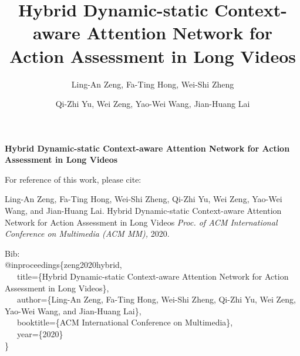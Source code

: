 \documentclass[sigconf]{acmart}
\begin{document}
{\onecolumn
\noindent \vspace{1cm}

\noindent \textbf{\huge{Hybrid Dynamic-static Context-aware Attention Network for Action Assessment in Long Videos}}

\vspace{2cm}


\vspace{2cm}





\noindent For reference of this work, please cite:

\vspace{1cm}
\noindent Ling-An Zeng, Fa-Ting Hong, Wei-Shi Zheng, Qi-Zhi Yu, Wei Zeng, Yao-Wei Wang, and Jian-Huang Lai.
Hybrid Dynamic-static Context-aware Attention Network for Action Assessment in Long Videos \emph{Proc. of ACM International Conference on Multimedia (ACM MM),} 2020.  

\vspace{1cm}
\noindent Bib:\\
\noindent
@inproceedings\{zeng2020hybrid,\\
\ \ \   title=\{Hybrid Dynamic-static Context-aware Attention Network for Action Assessment in Long Videos\},\\
\ \ \  author=\{Ling-An Zeng, Fa-Ting Hong, Wei-Shi Zheng, Qi-Zhi Yu, Wei Zeng, Yao-Wei Wang, and Jian-Huang Lai\},\\
\ \ \  booktitle=\{ACM International Conference on Multimedia\},\\
\ \ \  year=\{2020\}\\
\}
}

\title{Hybrid Dynamic-static Context-aware Attention Network for Action Assessment in Long Videos}



\author{Ling-An Zeng, Fa-Ting Hong, Wei-Shi Zheng  }

\author{Qi-Zhi Yu, Wei Zeng, Yao-Wei Wang, Jian-Huang Lai}
        
 
\end{document}
